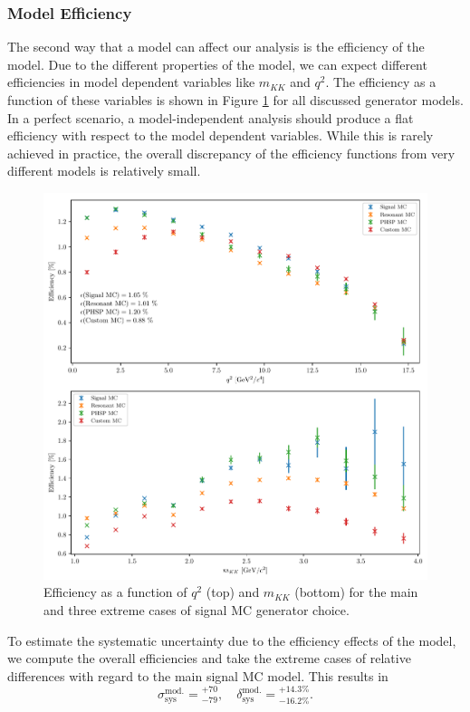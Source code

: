 \subsubsection{Model Efficiency}
The second way that a model can affect our analysis is the efficiency of the model. Due to the different properties of the model, we can expect different efficiencies in model dependent variables like $m_{KK}$ and $q^2$. The efficiency as a function of these variables is shown in Figure \ref{fig:efficiencies} for all discussed generator models. In a perfect scenario, a model-independent analysis should produce a flat efficiency with respect to the model dependent variables. While this is rarely achieved in practice, the overall discrepancy of the efficiency functions from very different models is relatively small.  
\begin{figure}[H]
	\centering
	\captionsetup{width=0.8\linewidth}
	\includegraphics[width=\linewidth]{fig/efficiencies}
	\caption{Efficiency as a function of $q^2$ (top) and $m_{KK}$ (bottom) for the main and three extreme cases of signal MC generator choice.}
	\label{fig:efficiencies}
\end{figure}
To estimate the systematic uncertainty due to the efficiency effects of the model, we compute the overall efficiencies and take the extreme cases of relative differences with regard to the main signal MC model. This results in
\begin{equation}
\sigma_{\mathrm{sys}}^{\mathrm{mod.}} = {}^{+70}_{-79},\quad \delta_{\mathrm{sys}}^{\mathrm{mod.}} = {}^{+14.3\%}_{-16.2\%}.
\end{equation}

